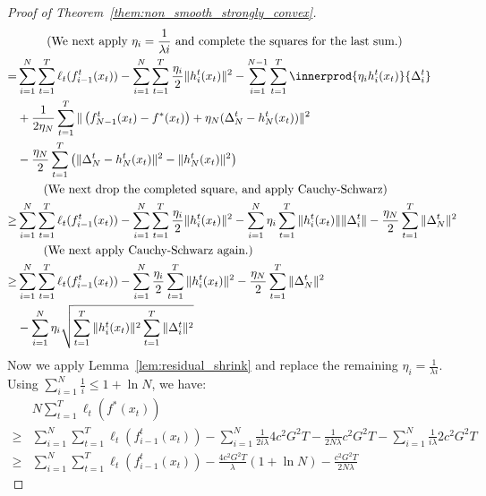 \begin{proof}[Proof of Theorem~\ref{them:non_smooth_strongly_convex}]
\begin{align}
&\;\;\;\;\;\;\;\;\; \text{(We next apply $\eta_i = \frac{1}{\lambda i}$ and complete the squares for the last sum.)} \nonumber \\
=& \sum _{i=1}^N \sum _{t=1}^T\ell_t (f^t_{i-1}(x_t)) 
    -\sum _{i=1}^N \sum _{t=1}^T \frac{\eta_i}{2} \Vert h^t_i(x_t) \Vert^2 
    - \sum_{i=1}^{N-1} \sum_{t=1}^T 
        \innerprod{\eta_i h^t_i(x_t)}{\Delta_{i}^t} 
\nonumber \\
&   + \frac{1}{2\eta_N} \sum_{t=1}^T 
        \Vert \left( f_{N-1}^t(x_t) - f^*(x_t)\right)  + \eta_N(\Delta_N^t - h_N^t(x_t))\Vert^2 
\nonumber \\
&   - \frac{\eta_N}{2}  \sum_{t=1}^T \left( \Vert \Delta_N^t - h_N^t(x_t)\Vert^2 - 
        \Vert h_N^t(x_t)\Vert^2  \right)
        \\
&\;\;\;\;\;\;\;\;
\text{(We next drop the completed square, and apply Cauchy-Schwarz)} \nonumber \\
\geq& \sum _{i=1}^N \sum _{t=1}^T\ell_t (f^t_{i-1}(x_t)) 
    -\sum _{i=1}^N \sum _{t=1}^T \frac{\eta_i}{2} \Vert h^t_i(x_t) \Vert^2 
    - \sum_{i=1}^{N} \eta_i \sum_{t=1}^T 
        \Vert h^t_i(x_t) \Vert \Vert \Delta_{i}^t \Vert
    - \frac{\eta_N}{2}  \sum_{t=1}^T \Vert \Delta_N^t \Vert^2     \\
&\;\;\;\;\;\;\;\;
\text{(We next apply Cauchy-Schwarz again.)} \nonumber \\
\geq& \sum _{i=1}^N \sum _{t=1}^T\ell_t (f^t_{i-1}(x_t)) 
    -\sum _{i=1}^N  \frac{\eta_i}{2}  \sum _{t=1}^T\Vert h^t_i(x_t) \Vert^2 
    - \frac{\eta_N}{2}  \sum_{t=1}^T \Vert \Delta_N^t \Vert^2 \nonumber \\
    &- \sum_{i=1}^{N}  
        \eta_i \sqrt{\sum_{t=1}^T \Vert h^t_i(x_t)  \Vert^2 
                     \sum_{t=1}^T \Vert \Delta_{i}^t\Vert^2}
\end{align}
Now we apply Lemma~\ref{lem:residual_shrink} and replace the remaining $\eta_i = \frac{1}{\lambda i}$. Using $\sum _{i=1}^N \frac{1}{i} \leq 1 + \ln N$, we have:
\begin{align}
&N\sum _{t=1}^T\ell_t (f^*(x_t))  \nonumber \\
\geq& \sum _{i=1}^N \sum _{t=1}^T\ell_t (f^t_{i-1}(x_t)) 
    -\sum _{i=1}^N \frac{1}{2i\lambda } 4c^2G^2T
    - \frac{1}{2N\lambda }  c^2G^2T
    - \sum_{i=1}^{N}  
        \frac{1}{i\lambda} 2c^2G^2T \\
\geq& \sum _{i=1}^N \sum _{t=1}^T\ell_t (f^t_{i-1}(x_t)) 
    -\frac{4c^2G^2T}{\lambda} (1 + \ln N)
    - \frac{c^2G^2T}{2N\lambda }  

\end{align}
\end{proof}
